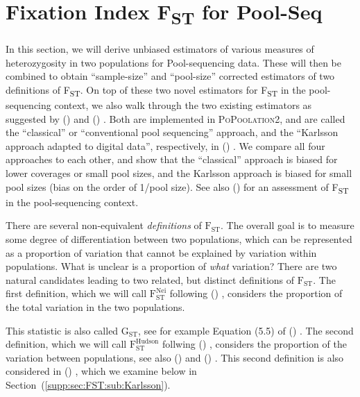 \documentclass[a4paper,9pt,DIV=14]{scrartcl}
\newcounter{todo}
\newcommand\todo[1]{}
\newcommand\toolname{\textsc}
\newcommand\secref[1]{Section~(\ref{#1})}
\newcommand{\fst}{F\textsubscript{ST}}
\newcommand\citeay[1]{\citeauthor{#1} (\citeyear{#1}) \cite{#1}}
\begin{document}
\section{Fixation Index \texorpdfstring{\fst}{FST} for Pool-Seq}
\label{supp:sec:FST}

In this section, we will derive unbiased estimators of various measures of heterozygosity in two populations for Pool-sequencing data.
These will then be combined to obtain ``sample-size'' and ``pool-size'' corrected estimators of two definitions of \fst.
On top of these two novel estimators for \fst{} in the pool-sequencing context, we also walk through the two existing estimators as suggested by \citeay{Kofler2011b} and \citeay{Karlsson2007}.
Both are implemented in \toolname{PoPoolation2}, and are called the ``classical'' or ``conventional pool sequencing'' approach, and the ``Karlsson approach adapted to digital data'', respectively, in \citeay{Kofler2011b}.
We compare all four approaches to each other, and show that the ``classical'' approach is biased for lower coverages or small pool sizes, and the Karlsson approach is biased for small pool sizes (bias on the order of 1/pool size).
See also \citeay{Hivert2018} for an assessment of \fst{} in the pool-sequencing context.

\todo{connect to this one as well?! \citeay{Hivert2018} -- I (Lucas) lack the time right now to go through this and work this into the text, but if you want, add it where needed. So far, we just mention it in a general fashion, see above.} 



\label{supp:sec:FST:sub:Definition}

There are several non-equivalent \emph{definitions} of $\text{F}_\text{ST}$.
The overall goal is to measure some degree of differentiation between two populations, which can be represented as a proportion of variation that cannot be explained by variation within populations.
What is unclear is a proportion of \emph{what} variation?
There are two natural candidates leading to two related, but distinct definitions of $\text{F}_\text{ST}$.
The first definition, which we will call $\text{F}_\text{ST}^\text{Nei}$ following \citeay{Nei1973}, considers the proportion of the total variation in the two populations.
\todo{Jeff, please check the following:}
This statistic is also called $\text{G}_\text{ST}$, see for example Equation (5.5) of \citeay{Hahn2018}.
The second definition, which we will call $\text{F}_\text{ST}^\text{Hudson}$ follwing \citeay{Hudson1992}, considers the proportion of the variation between populations, see also \citeay{Cockerham1969} and \citeay{Weir2002}.
This second definition is also considered in \citeay{Karlsson2007}, which we examine below in \secref{supp:sec:FST:sub:Karlsson}.
\end{document}
